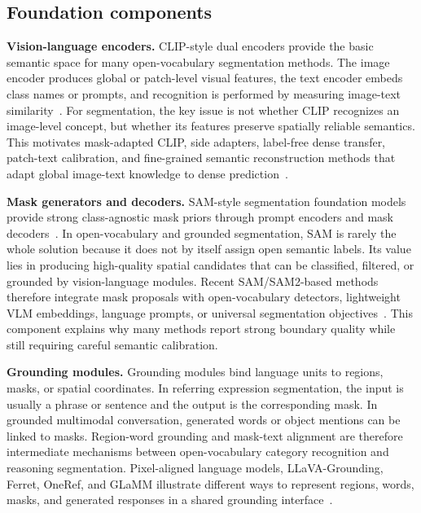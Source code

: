 \subsection{Foundation components}

\textbf{Vision-language encoders.} CLIP-style dual encoders provide the basic semantic space for many open-vocabulary segmentation methods. The image encoder produces global or patch-level visual features, the text encoder embeds class names or prompts, and recognition is performed by measuring image-text similarity~\citep{radford2021learning}. For segmentation, the key issue is not whether CLIP recognizes an image-level concept, but whether its features preserve spatially reliable semantics. This motivates mask-adapted CLIP, side adapters, label-free dense transfer, patch-text calibration, and fine-grained semantic reconstruction methods that adapt global image-text knowledge to dense prediction~\citep{liang2023ovseg,xu2023san,luo2024pnpovss,yangExploringCLIPsDense2025,yxchngAligningVisionLanguageModel2026}.

\textbf{Mask generators and decoders.} SAM-style segmentation foundation models provide strong class-agnostic mask priors through prompt encoders and mask decoders~\citep{kirillov2023sam}. In open-vocabulary and grounded segmentation, SAM is rarely the whole solution because it does not by itself assign open semantic labels. Its value lies in producing high-quality spatial candidates that can be classified, filtered, or grounded by vision-language modules. Recent SAM/SAM2-based methods therefore integrate mask proposals with open-vocabulary detectors, lightweight VLM embeddings, language prompts, or universal segmentation objectives~\citep{xhanBoostingSegmentAnything2025,hwangXSAMSegmentAnything2026,sgxiaoOpenworldsamExtendingSam22026,shinhOpenvocabularySemanticSegmentation2024}. This component explains why many methods report strong boundary quality while still requiring careful semantic calibration.

\textbf{Grounding modules.} Grounding modules bind language units to regions, masks, or spatial coordinates. In referring expression segmentation, the input is usually a phrase or sentence and the output is the corresponding mask. In grounded multimodal conversation, generated words or object mentions can be linked to masks. Region-word grounding and mask-text alignment are therefore intermediate mechanisms between open-vocabulary category recognition and reasoning segmentation. Pixel-aligned language models, LLaVA-Grounding, Ferret, OneRef, and GLaMM illustrate different ways to represent regions, words, masks, and generated responses in a shared grounding interface~\citep{xuPixelalignedLanguageModel2024,zhangLlavagroundingGroundedVisual2024,youFerretReferGround2024,xiaoOnerefUnifiedOnetower2024,rasheedGlammPixelGrounding2024}.


